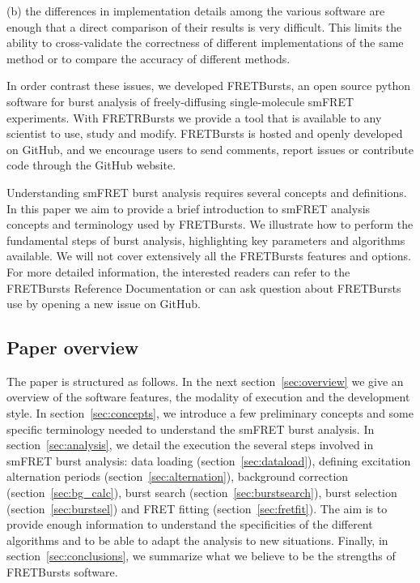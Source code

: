 (b) the differences in implementation details among the various software
are enough that a direct comparison of their results is very difficult. 
This limits the ability to cross-validate the correctness of different 
implementations of the same method or to compare the accuracy 
of different methods.

In order contrast these issues, we developed FRETBursts, 
an open source python software for burst analysis of freely-diffusing
single-molecule smFRET experiments. 
With FRETRBursts we provide a tool that is available to any scientist
to use, study and modify. 
FRETBursts is hosted and openly developed~\cite{Prli__2012} on GitHub, 
and we encourage users to send comments, report issues or contribute code
through the GitHub website.

Understanding smFRET burst analysis requires several concepts and definitions.
In this paper we aim to provide a brief introduction to smFRET analysis concepts
and terminology used by FRETBursts. We illustrate how to perform
the fundamental steps of burst analysis, highlighting key parameters
and algorithms available. We will not cover extensively all the FRETBursts
features and options. For more detailed information, the interested readers can refer
to the FRETBursts Reference Documentation or can ask question about FRETBursts use by opening 
a new issue on GitHub.

\subsection{Paper overview}

The paper is structured as follows.
In the next section~\ref{sec:overview} we give an overview of the software features,
the modality of execution and the development style.
In section~\ref{sec:concepts}, we
introduce a few preliminary concepts and some specific terminology needed
to understand the smFRET burst analysis.
In section~\ref{sec:analysis}, we detail the execution the several steps involved
in smFRET burst analysis: data loading (section~\ref{sec:dataload}), defining
excitation alternation periods (section~\ref{sec:alternation}), background
correction (section~\ref{sec:bg_calc}), burst search (section~\ref{sec:burstsearch}),
burst selection (section~\ref{sec:burstsel}) and FRET fitting (section~\ref{sec:fretfit}).
The aim is to provide enough information to understand the specificities of
the different algorithms and to be able to adapt the analysis to new situations.
Finally, in section~\ref{sec:conclusions}, we summarize what we believe to be
the strengths of FRETBursts software.

